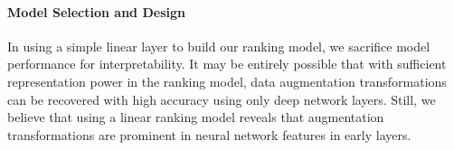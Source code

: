 


\paragraph{Model Selection and Design}
In using a simple linear layer to build our ranking model, we sacrifice model performance for interpretability.
It may be entirely possible that with sufficient representation power in the ranking model, data augmentation transformations can be recovered with high accuracy using only deep network layers.
Still, we believe that using a linear ranking model reveals that augmentation transformations are prominent in neural network features in early layers.
